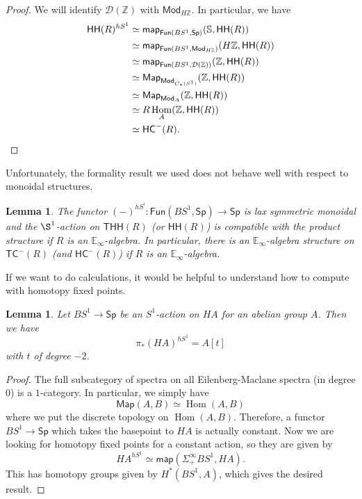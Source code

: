 \documentclass[10pt, oneside]{memoir}
\newtheorem{lem}[thm]{Lemma}
\theoremstyle{definition}
\theoremstyle{remark}
\theoremstyle{plain}
\theoremstyle{definition}
\theoremstyle{remark}
\newcommand{\Z}{\mathbb{Z}}
\newcommand{\E}{\mathbb{E}}
\newcommand{\bS}{\mathbb{S}}
\newcommand{\mc}[1]{\mathcal{#1}}
\newcommand{\ms}[1]{\mathsf{#1}}
\newcommand{\1}{\mathbf{1}}
\newcommand{\2}{\mathbf{2}}
\newcommand{\3}{\mathbf{3}}
\newcommand{\HC}{\ms{HC}}
\newcommand{\THH}{\ms{THH}}
\newcommand{\TC}{\ms{TC}}
\newcommand{\HH}{\ms{HH}}
\DeclareMathOperator{\Hom}{Hom}
\begin{document}
\begin{proof}
    We will identify \(\mc{D}(\Z) \) with \(\ms{Mod}_{H\Z} \). In particular, we have
    \begin{align*}
        \HH(R)^{hS^1} &\simeq \ms{map}_{\ms{Fun}(BS^1, \ms{Sp})}(\bS, \HH(R)) \\
        &\simeq \ms{map}_{\ms{Fun}(BS^1, \ms{Mod}_{H\Z})}(H\Z, \HH(R)) \\
        &\simeq \ms{map}_{\ms{Fun}(BS^1, \mc{D}(\Z))} (\Z, \HH(R)) \\
        &\simeq \ms{Map}_{\ms{Mod}_{C_*(S^1)}} (\Z, \HH(R)) \\
        &\simeq \ms{Map}_{\ms{Mod}_A} (\Z, \HH(R)) \\
        &\simeq R\Hom_A(\Z, \HH(R)) \\
        &\simeq \HC^-(R). \qedhere
    \end{align*}
\end{proof}

Unfortunately, the formality result we used does not behave well with respect to monoidal structures.

\begin{lem}
    The functor \((-)^{hS^!} \colon \ms{Fun}(BS^1, \ms{Sp}) \to \ms{Sp} \) is lax symmetric monoidal and the \(\S^1 \)-action on \(\THH(R) \) (or \(\HH(R) \)) is compatible with the product structure if \(R \) is an \(\E_{\infty} \)-algebra. In particular, there is an \(\E_{\infty} \)-algebra structure on \(\TC^-(R) \) (and \(\HC^-(R) \)) if \(R \) is an \(\E_{\infty} \)-algebra.
\end{lem}

If we want to do calculations, it would be helpful to understand how to compute with homotopy fixed points.

\begin{lem}
    Let \(BS^1 \to \ms{Sp} \) be an \(S^1 \)-action on \(HA \) for an abelian group \(A \). Then we have
    \[ \pi_*(HA)^{hS^1} = A[t] \]
    with \(t \) of degree \(-2 \).
\end{lem}

\begin{proof}
    The full subcategory of spectra on all Eilenberg-Maclane spectra (in degree \(0 \)) is a \(1 \)-category. In particular, we simply have
    \[ \ms{Map}(A, B) \simeq \Hom(A,B) \]
    where we put the discrete topology on \(\Hom(A,B) \). Therefore, a functor \(BS^1 \to \ms{Sp} \) which takes the basepoint to \(HA \) is actually constant. Now we are looking for homotopy fixed points for a constant action, so they are given by
    \[ HA^{hS^1} \simeq \ms{map}(\Sigma_+^{\infty} BS^1, HA). \]
    This has homotopy groups given by \(H^*(BS^1, A) \), which gives the desired result.
\end{proof}
\end{document}
